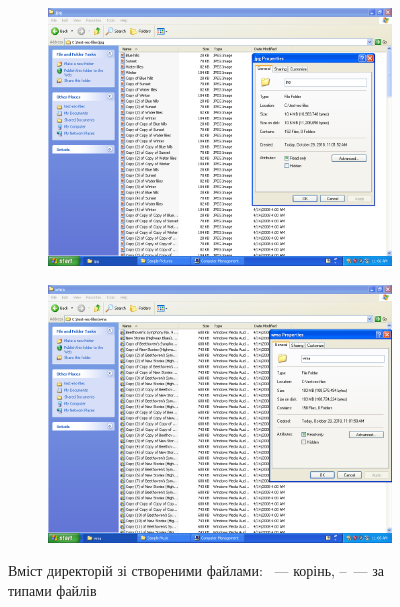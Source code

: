 \documentclass[
	a4paper,
	oneside,
	DIV = 12,
	fontsize = 13pt,
	headings = normal,
]{scrartcl}
\begin{document}
\begin{figure}
\begin{subfigure}{0.5\columnwidth}
				\includegraphics[height = 9\baselineskip]{./assets/y03s01-pcdiag-lab-03-p03.png}
				\caption{}
				\label{subfig:01-03-dll}
			\end{subfigure}%
			\begin{subfigure}{0.5\columnwidth}
				\centering
				\includegraphics[height = 9\baselineskip]{./assets/y03s01-pcdiag-lab-03-p04.png}
				\caption{}
				\label{subfig:01-04-wav}
			\end{subfigure}%
			\caption{Вміст директорій зі створеними файлами: ~— корінь, –~— за типами файлів}
			\label{fig:01-created-files}
		\end{figure}
\end{document}
